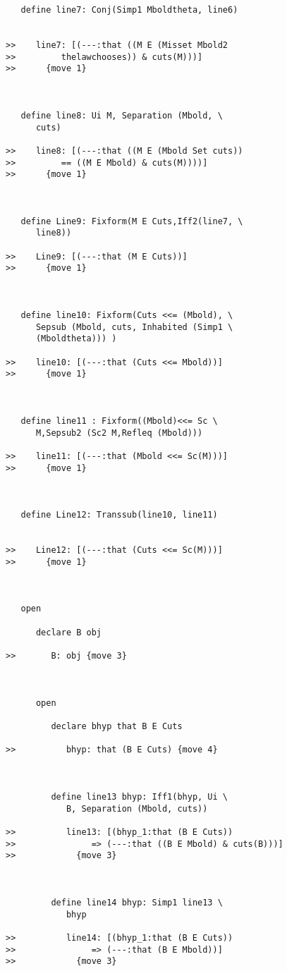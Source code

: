 \documentclass[12pt]{article}
\begin{document}
\begin{verbatim}
   define line7: Conj(Simp1 Mboldtheta, line6)


>>    line7: [(---:that ((M E (Misset Mbold2
>>         thelawchooses)) & cuts(M)))]
>>      {move 1}



   define line8: Ui M, Separation (Mbold, \
      cuts)

>>    line8: [(---:that ((M E (Mbold Set cuts))
>>         == ((M E Mbold) & cuts(M))))]
>>      {move 1}



   define Line9: Fixform(M E Cuts,Iff2(line7, \
      line8))

>>    Line9: [(---:that (M E Cuts))]
>>      {move 1}



   define line10: Fixform(Cuts <<= (Mbold), \
      Sepsub (Mbold, cuts, Inhabited (Simp1 \
      (Mboldtheta))) )

>>    line10: [(---:that (Cuts <<= Mbold))]
>>      {move 1}



   define line11 : Fixform((Mbold)<<= Sc \
      M,Sepsub2 (Sc2 M,Refleq (Mbold)))

>>    line11: [(---:that (Mbold <<= Sc(M)))]
>>      {move 1}



   define Line12: Transsub(line10, line11)


>>    Line12: [(---:that (Cuts <<= Sc(M)))]
>>      {move 1}



   open

      declare B obj

>>       B: obj {move 3}



      open

         declare bhyp that B E Cuts

>>          bhyp: that (B E Cuts) {move 4}



         define line13 bhyp: Iff1(bhyp, Ui \
            B, Separation (Mbold, cuts))

>>          line13: [(bhyp_1:that (B E Cuts))
>>               => (---:that ((B E Mbold) & cuts(B)))]
>>            {move 3}



         define line14 bhyp: Simp1 line13 \
            bhyp

>>          line14: [(bhyp_1:that (B E Cuts))
>>               => (---:that (B E Mbold))]
>>            {move 3}




\end{verbatim}
\end{document}
